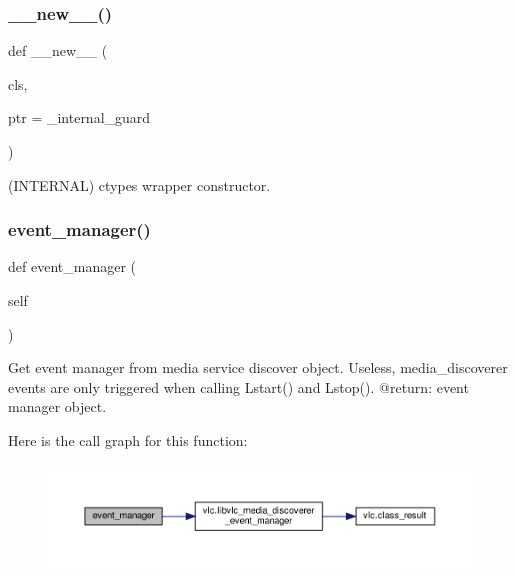 \subsubsection{\texorpdfstring{\+\_\+\+\_\+new\+\_\+\+\_\+()}{\_\_new\_\_()}}
{\footnotesize\ttfamily def \+\_\+\+\_\+new\+\_\+\+\_\+ (\begin{DoxyParamCaption}\item[{}]{cls,  }\item[{}]{ptr = {\ttfamily \+\_\+internal\+\_\+guard} }\end{DoxyParamCaption})}

\begin{DoxyVerb}(INTERNAL) ctypes wrapper constructor.
\end{DoxyVerb}
 \mbox{\label{classvlc_1_1_media_discoverer_ab7c92812cd259eb8e4e4fd292b81bfaa}} 
\subsubsection{\texorpdfstring{event\+\_\+manager()}{event\_manager()}}
{\footnotesize\ttfamily def event\+\_\+manager (\begin{DoxyParamCaption}\item[{}]{self }\end{DoxyParamCaption})}

\begin{DoxyVerb}Get event manager from media service discover object.
\deprecated Useless, media_discoverer events are only triggered when calling
L{start}() and L{stop}().
@return: event manager object.
\end{DoxyVerb}
 Here is the call graph for this function\+:
\nopagebreak
\begin{figure}[H]
\begin{center}
\leavevmode
\includegraphics[width=350pt]{classvlc_1_1_media_discoverer_ab7c92812cd259eb8e4e4fd292b81bfaa_cgraph}
\end{center}
\end{figure}
\mbox{\label{classvlc_1_1_media_discoverer_a74c01da18dc77cb449d3f428bd16d73a}} 
